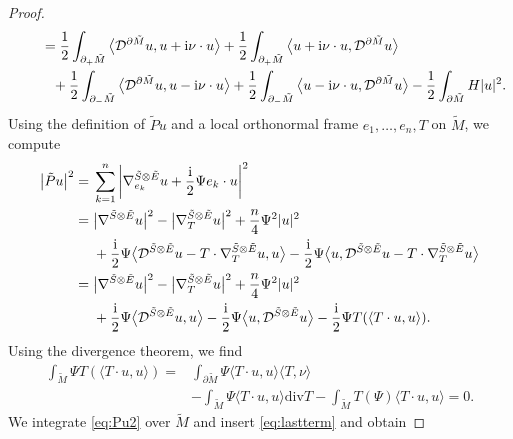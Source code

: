 \begin{proof}
\begin{align}
&\qquad= \frac{1}{2} \int_{\partial_+ \tilde{M}} \big\langle \mathcal{D}^{\partial \tilde{M}} u,u + {\rm i} \nu \cdot u \big\rangle + \frac{1}{2} \int_{\partial_+ \tilde{M}} \big\langle u + {\rm i} \nu \cdot u,\mathcal{D}^{\partial \tilde{M}} u \big\rangle\nonumber \\
&\qquad\phantom{=}{} + \frac{1}{2} \int_{\partial_- \tilde{M}} \big\langle \mathcal{D}^{\partial \tilde{M}} u,u - {\rm i} \nu \cdot u \big\rangle + \frac{1}{2} \int_{\partial_- \tilde{M}} \big\langle u - {\rm i} \nu \cdot u,\mathcal{D}^{\partial \tilde{M}} u \big\rangle
 - \frac{1}{2} \int_{\partial \tilde{M}} H |u|^2.\label{eq:formula1}
\end{align}
Using the definition of $\tilde{P} u$ and a local orthonormal frame $e_1,\dots,e_n,T$ on $\tilde{M}$, we compute
\begin{align}
\big|\tilde{P} u\big|^2
={}&
\sum_{k=1}^n \left| \nabla_{e_k}^{\tilde{S} \otimes \tilde{E}} u + \frac{\rm i}{2} \Psi e_k \cdot u \right|^2 \nonumber\\
={}&
\big|\nabla^{\tilde{S} \otimes \tilde{E}} u\big|^2 - \big|\nabla_T^{\tilde{S} \otimes \tilde{E}} u\big|^2 + \frac{n}{4} \Psi^2 |u|^2 \nonumber\\
& + \frac{\rm i}{2} \Psi \big\langle \mathcal{D}^{\tilde{S} \otimes \tilde{E}} u - T \cdot \nabla_T^{\tilde{S} \otimes \tilde{E}} u,u \big\rangle - \frac{\rm i}{2} \Psi \big\langle u,\mathcal{D}^{\tilde{S} \otimes \tilde{E}} u - T \cdot \nabla_T^{\tilde{S} \otimes \tilde{E}} u \big\rangle \nonumber\\
={}&
\big|\nabla^{\tilde{S} \otimes \tilde{E}} u\big|^2 - \big|\nabla_T^{\tilde{S} \otimes \tilde{E}} u\big|^2 + \frac{n}{4} \Psi^2 |u|^2 \nonumber\\
& + \frac{\rm i}{2} \Psi \big\langle \mathcal{D}^{\tilde{S} \otimes \tilde{E}} u,u \big\rangle - \frac{\rm i}{2} \Psi \big\langle u,\mathcal{D}^{\tilde{S} \otimes \tilde{E}} u \big\rangle - \frac{\rm i}{2} \Psi T(\langle T \cdot u,u \rangle).\label{eq:Pu2}
\end{align}
Using the divergence theorem, we find
\begin{align}
\int_{\tilde{M}} \Psi T(\langle T \cdot u,u \rangle)
={}& \int_{\partial \tilde{M}} \Psi \langle T \cdot u,u \rangle \langle T,\nu \rangle \nonumber\\
& - \int_{\tilde{M}} \Psi \langle T \cdot u,u \rangle \mathrm{div} T - \int_{\tilde{M}} T(\Psi) \langle T \cdot u,u \rangle = 0 .\label{eq:lastterm}
\end{align}
We integrate \eqref{eq:Pu2} over $\tilde{M}$ and insert \eqref{eq:lastterm} and obtain

\end{proof}
